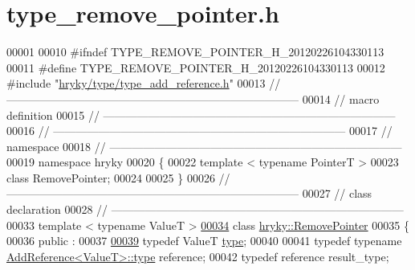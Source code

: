 \hypertarget{type__remove__pointer_8h_source}{\section{type\-\_\-remove\-\_\-pointer.\-h}
}

\begin{DoxyCode}
00001 
00010 \textcolor{preprocessor}{#ifndef TYPE\_REMOVE\_POINTER\_H\_20120226104330113}
00011 \textcolor{preprocessor}{}\textcolor{preprocessor}{#define TYPE\_REMOVE\_POINTER\_H\_20120226104330113}
00012 \textcolor{preprocessor}{}\textcolor{preprocessor}{#include "\hyperlink{type__add__reference_8h}{hryky/type/type_add_reference.h}"}
00013 \textcolor{comment}{//
      ------------------------------------------------------------------------------}
00014 \textcolor{comment}{// macro definition}
00015 \textcolor{comment}{//
      ------------------------------------------------------------------------------}
00016 \textcolor{comment}{//
      ------------------------------------------------------------------------------}
00017 \textcolor{comment}{// namespace}
00018 \textcolor{comment}{//
      ------------------------------------------------------------------------------}
00019 \textcolor{keyword}{namespace }hryky
00020 \{
00022     \textcolor{keyword}{template} < \textcolor{keyword}{typename} Po\textcolor{keywordtype}{int}erT >
00023     \textcolor{keyword}{class }RemovePointer;
00024     
00025 \}
00026 \textcolor{comment}{//
      ------------------------------------------------------------------------------}
00027 \textcolor{comment}{// class declaration}
00028 \textcolor{comment}{//
      ------------------------------------------------------------------------------}
00033 \textcolor{comment}{}\textcolor{keyword}{template} < \textcolor{keyword}{typename} ValueT >
\hypertarget{type__remove__pointer_8h_source_l00034}{}\hyperlink{classhryky_1_1_remove_pointer}{00034} \textcolor{keyword}{class }\hyperlink{classhryky_1_1_remove_pointer}{hryky::RemovePointer}
00035 \{
00036 \textcolor{keyword}{public} :
00037 
\hypertarget{type__remove__pointer_8h_source_l00039}{}\hyperlink{classhryky_1_1_remove_pointer_a7137db713acb2cd6b5a368ee5cca3842}{00039}     \textcolor{keyword}{typedef} ValueT                                  \hyperlink{classhryky_1_1_remove_pointer_a7137db713acb2cd6b5a368ee5cca3842}{type};
00040     
00041     \textcolor{keyword}{typedef} \textcolor{keyword}{typename} \hyperlink{classhryky_1_1_add_reference_a4b90c1381625432ba6152b7388bc4399}{AddReference<ValueT>::type}     reference;
00042     \textcolor{keyword}{typedef} reference                               result\_type;

\end{DoxyCode}
